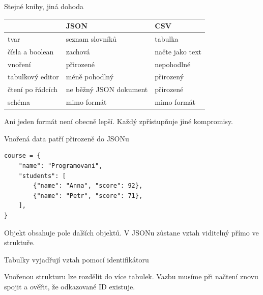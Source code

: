\documentclass[aspectratio=169]{beamer}
\begin{document}
\begin{frame}{Stejné knihy, jiná dohoda}
  \centering
  \begin{tabular}{lll}
    & \textbf{JSON} & \textbf{CSV} \\
    \hline
    tvar & seznam slovníků & tabulka \\
    čísla a boolean & zachová & načte jako text \\
    vnoření & přirozené & nepohodlné \\
    tabulkový editor & méně pohodlný & přirozený \\
    čtení po řádcích & ne běžný JSON dokument & přirozené \\
    schéma & mimo formát & mimo formát \\
  \end{tabular}
  \vspace{5mm}

  Ani jeden formát není obecně lepší. Každý zpřístupňuje jiné kompromisy.
\end{frame}

\begin{frame}[fragile]{Vnořená data patří přirozeně do JSONu}
\begin{lstlisting}[style=pythonSmall]
course = {
    "name": "Programovani",
    "students": [
        {"name": "Anna", "score": 92},
        {"name": "Petr", "score": 71},
    ],
}
\end{lstlisting}
  Objekt obsahuje pole dalších objektů. V JSONu zůstane vztah viditelný přímo ve struktuře.
\end{frame}

\begin{frame}{Tabulky vyjadřují vztah pomocí identifikátoru}
  \centering
  \vspace{6mm}

  Vnořenou strukturu lze rozdělit do více tabulek. Vazbu musíme při načtení znovu spojit a ověřit, že odkazované ID existuje.
\end{frame}
\end{document}
